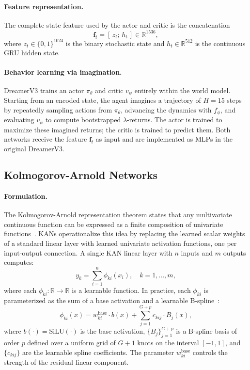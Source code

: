 \documentclass[11pt, a4paper]{article}
\begin{document}
\paragraph{Feature representation.}
The complete state feature used by the actor and critic is the concatenation
\begin{equation}
  \mathbf{f}_t = [\,z_t;\, h_t\,] \in \mathbb{R}^{1536},
\end{equation}
where $z_t \in \{0,1\}^{1024}$ is the binary stochastic state and $h_t \in
\mathbb{R}^{512}$ is the continuous GRU hidden state.

\paragraph{Behavior learning via imagination.}
DreamerV3 trains an actor $\pi_\theta$ and critic $v_\psi$ entirely within the
world model. Starting from an encoded state, the agent imagines a trajectory of
$H = 15$ steps by repeatedly sampling actions from $\pi_\theta$, advancing the
dynamics with $f_\phi$, and evaluating $v_\psi$ to compute bootstrapped
$\lambda$-returns. The actor is trained to maximize these imagined returns; the
critic is trained to predict them. Both networks receive the feature
$\mathbf{f}_t$ as input and are implemented as MLPs in the original DreamerV3.

\subsection{Kolmogorov-Arnold Networks}

\paragraph{Formulation.}
The Kolmogorov-Arnold representation theorem states that any multivariate
continuous function can be expressed as a finite composition of univariate
functions~\cite{kolmogorov1957superpositions}. KANs operationalize this idea by
replacing the learned scalar weights of a standard linear layer with learned
univariate activation functions, one per input-output connection. A single KAN
linear layer with $n$ inputs and $m$ outputs computes:
\begin{equation}
  y_k = \sum_{i=1}^{n} \phi_{ki}(x_i), \quad k = 1, \ldots, m,
\end{equation}
where each $\phi_{ki}: \mathbb{R} \to \mathbb{R}$ is a learnable function. In
practice, each $\phi_{ki}$ is parameterized as the sum of a base activation and
a learnable B-spline~\cite{liu2024kan}:
\begin{equation}
  \phi_{ki}(x) = w^{\text{base}}_{ki} \cdot b(x) + \sum_{j=1}^{G+p} c_{kij} \cdot B_j(x),
  \label{eq:kanlinear}
\end{equation}
where $b(\cdot) = \text{SiLU}(\cdot)$ is the base activation, $\{B_j\}_{j=1}^{G+p}$
is a B-spline basis of order $p$ defined over a uniform grid of $G{+}1$ knots
on the interval $[-1, 1]$, and $\{c_{kij}\}$ are the learnable spline
coefficients. The parameter $w^{\text{base}}_{ki}$ controls the strength of
the residual linear component.
\end{document}
